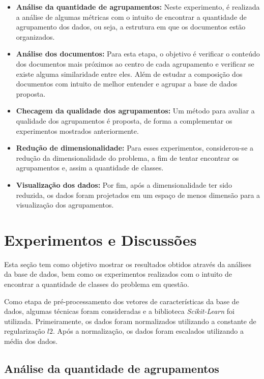 \documentclass[conference]{IEEEtran}
\begin{document}
\begin{itemize}
	\item \small \textbf{Análise da quantidade de agrupamentos:} Neste experimento, é realizada a análise de algumas métricas com o intuito de encontrar a quantidade de agrupamento dos dados, ou seja, a estrutura em que os documentos estão organizados.

	\item \small \textbf{Análise dos documentos:} Para esta etapa, o objetivo é verificar o conteúdo dos documentos mais próximos ao centro de cada agrupamento e verificar se existe alguma similaridade entre eles. Além de estudar a composição dos documentos com intuito de melhor entender e agrupar a base de dados proposta.

	\item \small \textbf{Checagem da qualidade dos agrupamentos:} Um método para avaliar a qualidade dos agrupamentos é proposta, de forma a complementar os experimentos mostrados anteriormente.

	\item \small \textbf{Redução de dimensionalidade:} Para esses experimentos, considerou-se a redução da dimensionalidade do problema, a fim de tentar encontrar os agrupamentos e, assim a quantidade de classes.

	\item \small \textbf{Visualização dos dados:} Por fim, após a dimensionalidade ter sido reduzida, os dados foram projetados em um espaço de menos dimensão para a visualização dos agrupamentos.

\end{itemize}

\section{Experimentos e Discussões} \label{sec:exp}

Esta seção tem como objetivo mostrar os resultados obtidos através da análises da base de dados, bem como os experimentos realizados com o intuito de encontrar a quantidade de classes do problema em questão.

Como etapa de pré-processamento dos vetores de características da base de dados, algumas técnicas foram consideradas e a biblioteca \emph{Scikit-Learn} foi utilizada. Primeiramente, os dados foram normalizados utilizando a constante de regularização $l2$. Após a normalização, os dados foram escalados utilizando a média dos dados.

\subsection{Análise da quantidade de agrupamentos}
\end{document}
